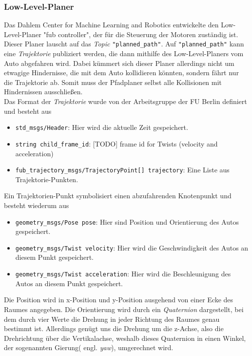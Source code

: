 \subsubsection{Low-Level-Planer}
Das Dahlem Center for Machine Learning and Robotics entwickelte den Low-Level-Planer "fub controller", der für die Steuerung der Motoren zuständig ist.
Dieser Planer lauscht auf das \textit{Topic} \verb|"planned_path"|. Auf \verb|"planned_path"| kann eine \textit{Trajektorie} publiziert werden, die dann mithilfe des Low-Level-Planers vom Auto abgefahren wird. Dabei kümmert sich dieser Planer allerdings nicht um etwagige Hindernisse, die mit dem Auto kollidieren könnten, sondern fährt nur die Trajektorie ab. Somit muss der Pfadplaner selbst alle Kollisionen mit Hindernissen ausschließen. \\
Das Format der \textit{Trajektorie} wurde von der Arbeitsgruppe der FU Berlin definiert und besteht aus
\begin{itemize}
\item \verb|std_msgs/Header|: Hier wird die aktuelle Zeit gespeichert.
\item \verb|string child_frame_id|: [TODO] frame id for Twists (velocity and acceleration)
\item \verb|fub_trajectory_msgs/TrajectoryPoint[] trajectory|: Eine Liste aus Trajektorie-Punkten.
\end{itemize}
Ein Trajektorien-Punkt symbolisiert einen abzufahrenden Knotenpunkt und besteht wiederum aus
\begin{itemize}
\item \verb|geometry_msgs/Pose pose|: Hier sind Position und Orientierung des Autos gespeichert.
\item \verb|geometry_msgs/Twist velocity|: Hier wird die Geschwindigkeit des Autos an diesem Punkt gespeichert.
\item \verb|geometry_msgs/Twist acceleration|: Hier wird die Beschleunigung des Autos an diesem Punkt gespeichert.
\end{itemize}
Die Position wird in x-Position und y-Position ausgehend von einer Ecke des Raumes angegeben. Die Orientierung wird durch ein \textit{Quaternion} dargestellt, bei dem durch vier Werte die Drehung in jeder Richtung des Raumes genau bestimmt ist. Allerdings genügt uns die Drehung um die z-Achse, also die Drehrichtung über die Vertikalachse, weshalb dieses Quaternion in einen Winkel, der sogenannten Gierung( engl. \textit{yaw}), umgerechnet wird.
\\

